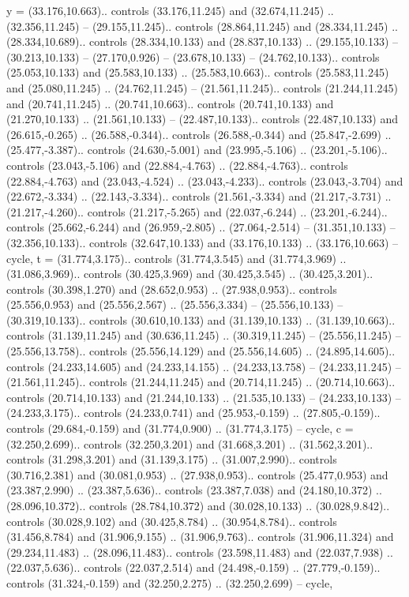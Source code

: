 {y} = {(33.176,10.663).. controls (33.176,11.245) and (32.674,11.245) .. (32.356,11.245) -- (29.155,11.245).. controls (28.864,11.245) and (28.334,11.245) .. (28.334,10.689).. controls (28.334,10.133) and (28.837,10.133) .. (29.155,10.133) -- (30.213,10.133) -- (27.170,0.926) -- (23.678,10.133) -- (24.762,10.133).. controls (25.053,10.133) and (25.583,10.133) .. (25.583,10.663).. controls (25.583,11.245) and (25.080,11.245) .. (24.762,11.245) -- (21.561,11.245).. controls (21.244,11.245) and (20.741,11.245) .. (20.741,10.663).. controls (20.741,10.133) and (21.270,10.133) .. (21.561,10.133) -- (22.487,10.133).. controls (22.487,10.133) and (26.615,-0.265) .. (26.588,-0.344).. controls (26.588,-0.344) and (25.847,-2.699) .. (25.477,-3.387).. controls (24.630,-5.001) and (23.995,-5.106) .. (23.201,-5.106).. controls (23.043,-5.106) and (22.884,-4.763) .. (22.884,-4.763).. controls (22.884,-4.763) and (23.043,-4.524) .. (23.043,-4.233).. controls (23.043,-3.704) and (22.672,-3.334) .. (22.143,-3.334).. controls (21.561,-3.334) and (21.217,-3.731) .. (21.217,-4.260).. controls (21.217,-5.265) and (22.037,-6.244) .. (23.201,-6.244).. controls (25.662,-6.244) and (26.959,-2.805) .. (27.064,-2.514) -- (31.351,10.133) -- (32.356,10.133).. controls (32.647,10.133) and (33.176,10.133) .. (33.176,10.663) -- cycle},
{t} = {(31.774,3.175).. controls (31.774,3.545) and (31.774,3.969) .. (31.086,3.969).. controls (30.425,3.969) and (30.425,3.545) .. (30.425,3.201).. controls (30.398,1.270) and (28.652,0.953) .. (27.938,0.953).. controls (25.556,0.953) and (25.556,2.567) .. (25.556,3.334) -- (25.556,10.133) -- (30.319,10.133).. controls (30.610,10.133) and (31.139,10.133) .. (31.139,10.663).. controls (31.139,11.245) and (30.636,11.245) .. (30.319,11.245) -- (25.556,11.245) -- (25.556,13.758).. controls (25.556,14.129) and (25.556,14.605) .. (24.895,14.605).. controls (24.233,14.605) and (24.233,14.155) .. (24.233,13.758) -- (24.233,11.245) -- (21.561,11.245).. controls (21.244,11.245) and (20.714,11.245) .. (20.714,10.663).. controls (20.714,10.133) and (21.244,10.133) .. (21.535,10.133) -- (24.233,10.133) -- (24.233,3.175).. controls (24.233,0.741) and (25.953,-0.159) .. (27.805,-0.159).. controls (29.684,-0.159) and (31.774,0.900) .. (31.774,3.175) -- cycle},
{c} = {(32.250,2.699).. controls (32.250,3.201) and (31.668,3.201) .. (31.562,3.201).. controls (31.298,3.201) and (31.139,3.175) .. (31.007,2.990).. controls (30.716,2.381) and (30.081,0.953) .. (27.938,0.953).. controls (25.477,0.953) and (23.387,2.990) .. (23.387,5.636).. controls (23.387,7.038) and (24.180,10.372) .. (28.096,10.372).. controls (28.784,10.372) and (30.028,10.133) .. (30.028,9.842).. controls (30.028,9.102) and (30.425,8.784) .. (30.954,8.784).. controls (31.456,8.784) and (31.906,9.155) .. (31.906,9.763).. controls (31.906,11.324) and (29.234,11.483) .. (28.096,11.483).. controls (23.598,11.483) and (22.037,7.938) .. (22.037,5.636).. controls (22.037,2.514) and (24.498,-0.159) .. (27.779,-0.159).. controls (31.324,-0.159) and (32.250,2.275) .. (32.250,2.699) -- cycle},
